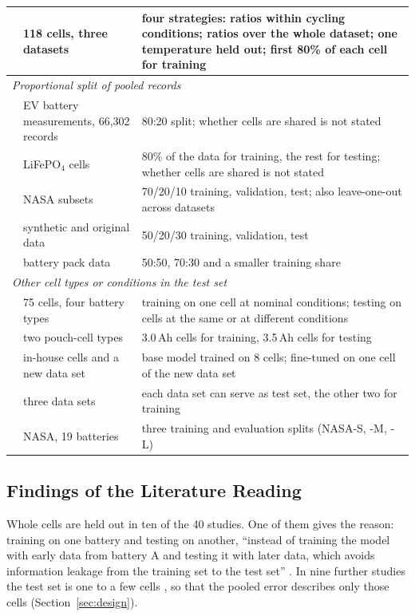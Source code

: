 \documentclass{ieeeaccess}
\begin{document}
\begin{table}[!t]
\begin{tabular}{p{}p{}p{}}
\cite{aud28} & 118 cells, three datasets & four strategies: ratios within cycling conditions; ratios over the whole dataset; one temperature held out; first 80\% of each cell for training \\
\midrule
\multicolumn{3}{l}{\textit{Proportional split of pooled records}} \\
\cite{aud37} & EV battery measurements, 66,302 records & 80:20 split; whether cells are shared is not stated \\
\cite{aud60} & LiFePO$_4$ cells & 80\% of the data for training, the rest for testing; whether cells are shared is not stated \\
\cite{aud13} & NASA subsets & 70/20/10 training, validation, test; also leave-one-out across datasets \\
\cite{aud27} & synthetic and original data & 50/20/30 training, validation, test \\
\cite{aud57} & battery pack data & 50:50, 70:30 and a smaller training share \\
\midrule
\multicolumn{3}{l}{\textit{Other cell types or conditions in the test set}} \\
\cite{aud31} & 75 cells, four battery types & training on one cell at nominal conditions; testing on cells at the same or at different conditions \\
\cite{aud45} & two pouch-cell types & 3.0\,Ah cells for training, 3.5\,Ah cells for testing \\
\cite{aud49} & in-house cells and a new data set & base model trained on 8 cells; fine-tuned on one cell of the new data set \\
\cite{aud01} & three data sets & each data set can serve as test set, the other two for training \\
\cite{aud26} & NASA, 19 batteries & three training and evaluation splits (NASA-S, -M, -L) \\
\bottomrule
\end{tabular}
\end{table}

\subsection{Findings of the Literature Reading}
Whole cells are held out in ten of the 40 studies. One of them gives the reason: training on one battery and testing on another, ``instead of training the model with early data from battery A and testing it with later data, which avoids information leakage from the training set to the test set'' \cite{wang2024}. In nine further studies the test set is one to a few cells \cite{aud24,aud32,aud21}, so that the pooled error describes only those cells (Section~\ref{sec:design}).
\end{document}

